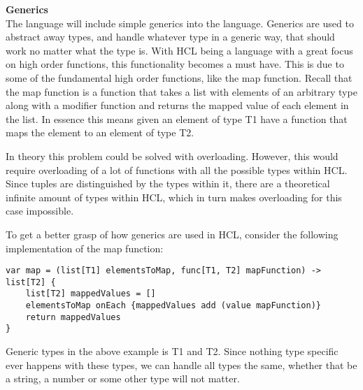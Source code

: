 \textbf{Generics}\\

The language will include simple generics into the language.
Generics are used to abstract away types, and handle whatever type in a generic way, that should work no matter what the type is.
With HCL being a language with a great focus on high order functions, this functionality becomes a must have.
This is due to some of the fundamental high order functions, like the map function.
Recall that the map function is a function that takes a list with elements of an arbitrary type along with a modifier function and returns the mapped value of each element in the list.
In essence this means given an element of type T1 have a function that maps the element to an element of type T2.

In theory this problem could be solved with overloading. However, this would require overloading of a lot of functions with all the possible types within HCL. 
Since tuples are distinguished by the types within it, there are a theoretical infinite amount of types within HCL, which in turn makes overloading for this case impossible.

To get a better grasp of how generics are used in HCL, consider the following implementation of the map function:
\begin{lstlisting}
var map = (list[T1] elementsToMap, func[T1, T2] mapFunction) -> list[T2] {
	list[T2] mappedValues = []
	elementsToMap onEach {mappedValues add (value mapFunction)}
	return mappedValues
}
\end{lstlisting}

Generic types in the above example is T1 and T2. 
Since nothing type specific ever happens with these types, we can handle all types the same, whether that be a string, a number or some other type will not matter.



